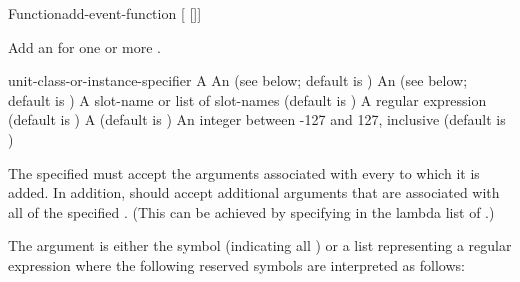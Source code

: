 \documentclass[10pt,twoside,english,pdftex]{article}
\begin{document}
\W\entities
\T\clearpage


\begin{functiondoc}{Function}{add-event-function}%
  { [ 
    []] \\
     }
%


\fnsyntax

\fnpurpose Add an  for one or more .

\fnpackage {}

\fnmodule {}

\fnargs
\begin{args}{unit-class-or-instance-specifier}
\arg[function] A 
 An  
(see below; default is )
 An 
(see below; default is )
 A slot-name or list
of slot-names (default is )
 A 
regular expression 
(default is \code{(*)})
\arg[permanent] A  (default is \nil)
\arg[priority] An integer between -127 and 127, inclusive (default is )
\end{args}

\fndsyntax
\W\supp\tabletop
\eventclassspec
\subeventingspec
\syntaxsep
\unitclassinstancespec
\subclassingspec

\fndescription 
The specified  must accept the arguments associated with every
 to which it is added.  In addition, 
should accept additional arguments that are associated with all
 of the specified . (This can be
achieved by specifying  in the lambda list of
.)

The  argument is either the symbol  (indicating
all ) or a list representing a regular
expression where the following reserved symbols are interpreted as
follows:
\spaceinstanceregexp


\end{functiondoc}
\end{document}
